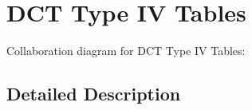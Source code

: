 \hypertarget{group__DCT4__IDCT4__Table}{}\section{D\+CT Type IV Tables}
\label{group__DCT4__IDCT4__Table}
Collaboration diagram for D\+CT Type IV Tables\+:


\subsection{Detailed Description}
